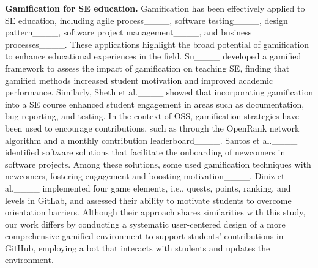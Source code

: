 
\textbf{Gamification for SE education.} Gamification has been effectively applied to SE education, including agile process____, software testing____, design pattern____, software project management____, and business processes____. These applications highlight the broad potential of gamification to enhance educational experiences in the field. Su____ developed a gamified framework to assess the impact of gamification on teaching SE, finding that gamified methods increased student motivation and improved academic performance. Similarly, Sheth et al.____ showed that incorporating gamification into a SE course enhanced student engagement in areas such as documentation, bug reporting, and testing. In the context of OSS, gamification strategies have been used to encourage contributions, such as through the OpenRank network algorithm and a monthly contribution leaderboard____. Santos et al.____ identified software solutions that facilitate the onboarding of newcomers in software projects. Among these solutions, some used gamification techniques with newcomers, fostering engagement and boosting motivation____. Diniz et al.____ implemented four game elements, i.e., quests, points, ranking, and levels in GitLab, and assessed their ability to motivate students to overcome orientation barriers. Although their approach shares similarities with this study, our work differs by conducting a systematic user-centered design of a more comprehensive gamified environment to support students' contributions in GitHub, employing a bot that interacts with students and updates the environment.  

